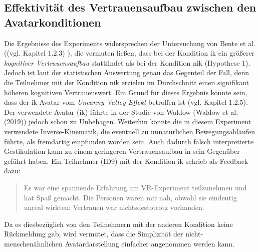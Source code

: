 \documentclass[a4paper,11pt]{article}%
\renewcommand{\\}{\vspace*{0.5\baselineskip} \newline}
\begin{document}
\subsection{Effektivität des Vertrauensaufbau zwischen den Avatarkonditionen}
Die Ergebnisse des Experiments widersprechen der Untersuchung von Bente et al. ((vgl. Kapitel 1.2.3) \citep{riedl2014trusting}), die vermuten ließen, dass bei der Kondition \ac{ik} ein größerer \textit{kognitiver Vertrauensaufbau} stattfindet als bei der Kondition \ac{nik} (Hypothese 1). Jedoch ist laut der statistischen Auswertung genau das Gegenteil der Fall, denn die Teilnehmer mit der Kondition \ac{nik} erzielen im Durchschnitt einen signifikant höheren kognitiven Vertrauenswert.
Ein Grund für dieses Ergebnis könnte sein, dass der \ac{ik}-Avatar vom \textit{Uncanny Valley Effekt} betroffen ist (vgl. Kapitel 1.2.5). Der verwendete Avatar (\ac{ik}) führte in der Studie von Waldow (Waldow et al. (2019)) jedoch schon zu Unbehagen.
Weiterhin könnte die in diesem Experiment verwendete Inverse-Kinematik, die eventuell zu unnatürlichen Bewegungsabläufen führte, als fremdartig empfunden worden sein. Auch dadurch falsch interpretierte Gestikulation kann zu einem geringeren Vertrauensaufbau in sein Gegenüber geführt haben. Ein Teilnehmer (ID9) mit der Kondition \ac{ik} schrieb als Feedback dazu:
\begin{quote}
\glqq{}Es war eine spannende Erfahrung am VR-Experiment teilzunehmen und hat Spaß gemacht. Die
Personen waren mir nah, obwohl sie eindeutig unreal wirkten; Vertrauen war nichtsdestotrotz vorhanden.\dq{}
\end{quote}

Da es diesbezüglich von den Teilnehmern mit der anderen Kondition keine Rückmeldung gab, wird vermutet, dass die Simplizität der nicht-menschenähnlichen Avatardarstellung einfacher angenommen werden kann.
\end{document}
